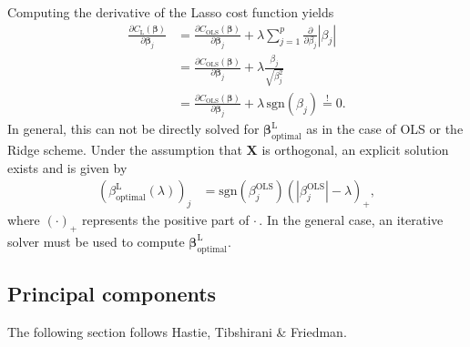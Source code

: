 \documentclass[a4paper, twocolumn]{article}
\begin{document}
Computing the derivative of the Lasso cost function yields
\begin{align}
\frac{\partial C_\text{L}(\bm\beta)}{\partial \bm\beta_j} &=  \frac{\partial C_\text{OLS}(\bm\beta)}{\partial \bm\beta_j} + \lambda \sum_{j=1}^p \frac{\partial}{\partial \beta_j} |\beta_j| \nonumber \\
%
&= \frac{\partial C_\text{OLS}(\bm\beta)}{\partial \bm\beta_j} + \lambda\frac{\beta_j}{\sqrt{\beta_j^2}} \nonumber \\
%
&= \frac{\partial C_\text{OLS}(\bm\beta)}{\partial \bm\beta_j} + \lambda\,\text{sgn}(\beta_j) \stackrel{!}{=} 0.
\end{align}
In general, this can not be directly solved for $\bm\beta_\text{optimal}^\text{L}$ as in the case of OLS or the Ridge scheme. Under the assumption that $\mathbf{X}$ is orthogonal, an explicit solution exists and is given by\autocite{mehta2018highbias}
\begin{align}
\left(\beta_\text{optimal}^\text{L}(\lambda)\right)_j &= \text{sgn}(\beta_j^\text{OLS})\left(|\beta_j^\text{OLS}| - \lambda\right)_+,
\end{align}
where $(\cdot)_+$ represents the positive part of $\cdot\,$. In the general case, an iterative solver must be used to compute $\bm\beta_\text{optimal}^\text{L}$.

\subsection{Principal components \label{sect:principal}}
The following section follows Hastie, Tibshirani \& Friedman\autocite{trevor2009elements}.
\end{document}
